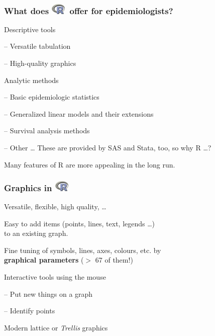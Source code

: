 \documentclass[handout,12pt]{beamer}
\newcommand{\Rlogo}[1]{\includegraphics[#1]{Rlogo}}
\begin{document}

\begin{frame}
\frametitle{What does \Rlogo{height=1.2em}\ offer for epidemiologists?}

\pause
\bi
\item Descriptive tools
\bi 
\item[--] Versatile tabulation
\item[--] High-quality graphics
\ei
\pause
\item Analytic methods
\bi
\item[--] Basic epidemiologic statistics
\item[--] Generalized linear models and their extensions
\item[--] Survival analysis methods
\item[--] Other \dots
\ei
\ei
\pause
These are provided by SAS and Stata, too, so why R \dots? 

\pause\medskip
Many features of R
are more appealing in the long run.
\end{frame}  

\begin{frame}
\frametitle{Graphics in \Rlogo{height=1.2em}}

\bi
\item Versatile, flexible, high quality, \dots \pause\medskip
\item Easy to add items (points, lines, text, legends \dots) \\ %
to an existing graph. %
\pause\medskip
\item Fine tuning of symbols, lines, axes, colours, etc. by \\
 {\bf graphical parameters}  
  ($>$ 67 of them!) 
\pause\medskip
\item Interactive tools using the mouse
    \bi
    \item[--] Put new things on a graph 
    \item[--] Identify points 
    \ei
\pause %
\item Modern lattice or {\it Trellis} graphics %
\ei
\end{frame}
\end{document}
